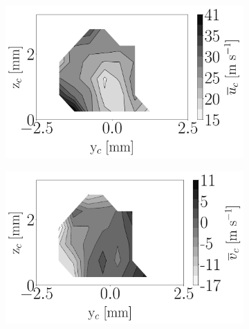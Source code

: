 \begin{figure}[h!]
\begin{subfigure}[b]{0.3\textwidth}
	\centering
   \includegraphics[scale=\scaleSLIBIMER]{./part3_applications/figures_ch8_resolved/injectors_SLI/dx15_xD05p00_ux_mean_map}
\end{subfigure}
   \hspace{0.17in}
\begin{subfigure}[b]{0.3\textwidth}
	\centering
   \includegraphics[scale=\scaleSLIBIMER]{./part3_applications/figures_ch8_resolved/injectors_SLI/dx15_xD05p00_uy_mean_map}
\end{subfigure}
   \hspace{0.17in}
\begin{subfigure}[b]{0.3\textwidth}
	\centering

\end{subfigure}
\end{figure}
